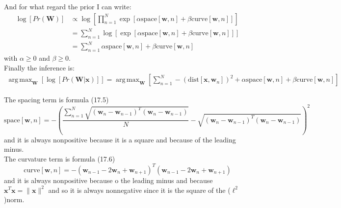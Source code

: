 \documentclass[a4paper,12pt]{article}
\DeclareMathOperator*{\argmax}{arg\,max}
\begin{document}
And for what regard the prior I can write:
\begin{equation}
\begin{split}
\log{[Pr(\mathbf{W})]} & \propto \log{[\prod_{n=1}^N \exp{[\alpha \text{space}[\mathbf{w},n]+\beta \text{curve}[\mathbf{w},n]]}]} \\
& = \sum_{n=1}^N \log{[\exp{[\alpha \text{space}[\mathbf{w},n]+\beta \text{curve}[\mathbf{w},n]]}]} \\
& = \sum_{n=1}^N \alpha \text{space}[\mathbf{w},n]+\beta \text{curve}[\mathbf{w},n]
\end{split}
\end{equation}
with $\alpha\geq0$ and $\beta\geq0$.\\

Finally the inference is:
\begin{equation}
\begin{split}
\argmax_{\mathbf{W}}[\log{[Pr(\mathbf{W}\vert\mathbf{x})]}] = \argmax_{\mathbf{W}}[\sum_{n=1}^N -(\text{dist}[\mathbf{x},\mathbf{w}_n])^2+\alpha \text{space}[\mathbf{w},n]+\beta \text{curve}[\mathbf{w},n]]
\end{split}
\end{equation}

The spacing term is formula (17.5)
\begin{equation}
\text{space}[\mathbf{w},n]= - \left(\frac{\sum_{n=1}^N \sqrt{\left( \mathbf{w}_{n}-\mathbf{w}_{n-1} \right)^T\left( \mathbf{w}_{n}-\mathbf{w}_{n-1} \right)}}{N} - \sqrt{\left( \mathbf{w}_{n}-\mathbf{w}_{n-1} \right)^T\left( \mathbf{w}_{n}-\mathbf{w}_{n-1} \right)}\right)^2
\end{equation}
and it is always nonpositive because it is a square and because of the leading minus.\\

The curvature term is formula (17.6)
\begin{equation}
\text{curve}[\mathbf{w},n]= - \left(\mathbf{w}_{n-1}-2\mathbf{w}_{n}+\mathbf{w}_{n+1}\right)^T\left(\mathbf{w}_{n-1}-2\mathbf{w}_{n}+\mathbf{w}_{n+1}\right)
\end{equation}
and it is always nonpositive because o the leading minus and because $\mathbf{x}^T\mathbf{x}=\|\mathbf{x}\|^2$ and so it is always nonnegative since it is the square of the ($\ell^2$)norm.\\
\end{document}
